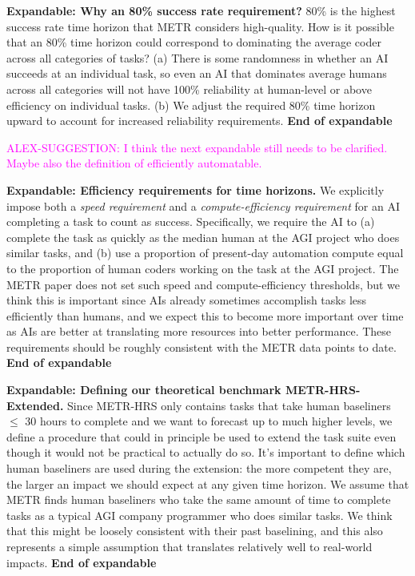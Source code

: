 \documentclass{article}
\theoremstyle{definition}
\newcommand{\ASUG}[1]{\textcolor{magenta}{ALEX-SUGGESTION: #1}}
\begin{document}
\textbf{Expandable: Why an 80\% success rate requirement?} 80\% is the highest success rate time horizon that METR considers high-quality. How is it possible that an 80\% time horizon could correspond to dominating the average coder across all categories of tasks? (a) There is some randomness in whether an AI succeeds at an individual task, so even an AI that dominates average humans across all categories will not have 100\% reliability at human-level or above efficiency on individual tasks. (b) We adjust the required 80\% time horizon upward to account for increased reliability requirements. 
\textbf{End of expandable}

\ASUG{I think the next expandable still needs to be clarified. Maybe also the definition of efficiently automatable.}

\textbf{Expandable: Efficiency requirements for time horizons.} We explicitly impose both a \textit{speed requirement} and a \textit{compute-efficiency requirement} for an AI completing a task to count as success. Specifically, we require the AI to (a) complete the task as quickly as the median human at the AGI project who does similar tasks, and (b) use a proportion of present-day automation compute equal to the proportion of human coders working on the task at the AGI project. The METR paper does not set such speed and compute-efficiency thresholds, but we think this is important since AIs already sometimes accomplish tasks less efficiently than humans, and we expect this to become more important over time as AIs are better at translating more resources into better performance. These requirements should be roughly consistent with the METR data points to date.
\textbf{End of expandable}

\textbf{Expandable: Defining our theoretical benchmark METR-HRS-Extended.} Since METR-HRS only contains tasks that take human baseliners $\leq$ 30 hours to complete and we want to forecast up to much higher levels, we define a procedure that could in principle be used to extend the task suite even though it would not be practical to actually do so. It’s important to define which human baseliners are used during the extension: the more competent they are, the larger an impact we should expect at any given time horizon. We assume that METR finds human baseliners who take the same amount of time to complete tasks as a typical AGI company programmer who does similar tasks. We think that this might be loosely consistent with their past baselining, and this also represents a simple assumption that translates relatively well to real-world impacts. \textbf{End of expandable}
\end{document}
